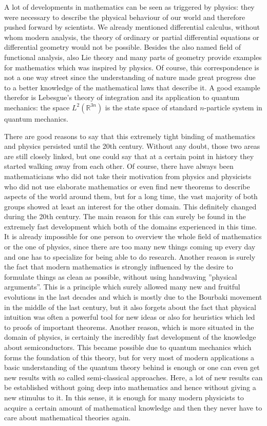 A lot of developments in mathematics can be seen as triggered by physics: they 
were necessary to describe the physical behaviour of our world and therefore 
pushed forward by scientists. We already mentioned differential calculus, 
without whom modern analysis, the theory of ordinary or partial differential 
equations or differential geometry would not be possible. Besides the also 
named field of functional analysis, also Lie theory and many parts of geometry 
provide examples for mathematics which was inspired by physics. Of course, this 
correspondence is not a one way street since the understanding of nature made 
great progress due to a better knowledge of the mathematical laws that describe 
it. A good example therefor is Lebesgue's theory of integration and its 
application to quantum mechanics: the space $L^2(\mathbb{R}^{3n})$ is the state 
space of standard $n$-particle system in quantum mechanics.


There are good reasons to say that this extremely tight binding of mathematics 
and physics persisted until the 20th century. Without any doubt, those two 
areas are still closely linked, but one could say that at a certain point in 
history they started walking away from each other. Of course, there have always 
been mathematicians who did not take their motivation from physics and 
physicists who did not use elaborate mathematics or even find new theorems to 
describe aspects of the world around them, but for a long time, the vast 
majority of both groups showed at least an interest for the other domain. This 
definitely changed during the 20th century. The main reason for this can 
surely be found in the extremely fast development which both of the domains 
experienced in this time. It is already impossible for one person to overview 
the whole field of mathematics or the one of physics, since there are too many 
new things coming up every day and one has to specialize for being able to do 
research. Another reason is surely the fact that modern mathematics is 
strongly influenced by the desire to formulate things as clean as possible, 
without using handwaving ''physical arguments''. This is a principle which 
surely allowed many new and fruitful evolutions in the last decades and which 
is mostly due to the Bourbaki movement in the middle of the last century, but 
it also forgets about the fact that physical intuition was often a powerful 
tool for new ideas or also for heuristics which led to proofs of important 
theorems. Another reason, which is more situated in the domain of physics, is 
certainly the incredibly fast development of the knowledge about 
semiconductors. This became possible due to quantum mechanics which forms the 
foundation of this theory, but for very most of modern applications a basic 
understanding of the quantum theory behind is enough or one can even get new 
results with so called semi-classical approaches. Here, a lot of new results 
can be established without going deep into mathematics and hence without giving 
a new stimulus to it. In this sense, it is enough for many modern physicists to 
acquire a certain amount of mathematical knowledge and then they never have to 
care about mathematical theories again.


